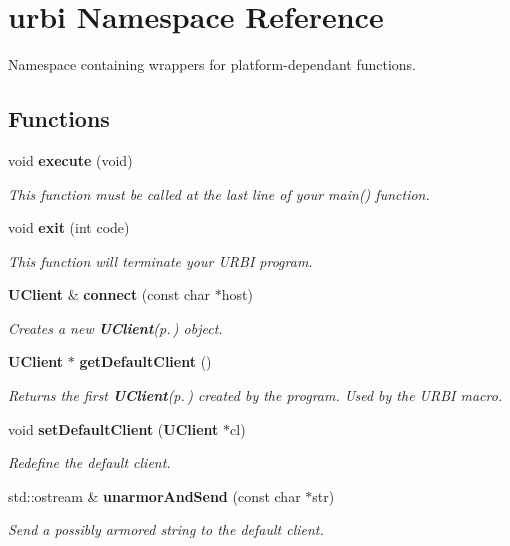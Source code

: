 \section{urbi Namespace Reference}
\label{namespaceurbi}
Namespace containing wrappers for platform-dependant functions.  


\subsection*{Functions}
\begin{CompactItemize}
\item 
void {\bf execute} (void)\label{namespaceurbi_a5}

\begin{CompactList}\small\item\em This function must be called at the last line of your main() function. \item\end{CompactList}\item 
void {\bf exit} (int code)\label{namespaceurbi_a6}

\begin{CompactList}\small\item\em This function will terminate your URBI program. \item\end{CompactList}\item 
{\bf UClient} \& {\bf connect} (const char $\ast$host)\label{namespaceurbi_a7}

\begin{CompactList}\small\item\em Creates a new {\bf UClient}{\rm (p.\,\pageref{classUClient})} object. \item\end{CompactList}\item 
{\bf UClient} $\ast$ {\bf get\-Default\-Client} ()\label{namespaceurbi_a8}

\begin{CompactList}\small\item\em Returns the first {\bf UClient}{\rm (p.\,\pageref{classUClient})} created by the program. Used by the URBI macro. \item\end{CompactList}\item 
void {\bf set\-Default\-Client} ({\bf UClient} $\ast$cl)\label{namespaceurbi_a9}

\begin{CompactList}\small\item\em Redefine the default client. \item\end{CompactList}\item 
std::ostream \& {\bf unarmor\-And\-Send} (const char $\ast$str)\label{namespaceurbi_a10}

\begin{CompactList}\small\item\em Send a possibly armored string to the default client. \item\end{CompactList}\end{CompactItemize}
